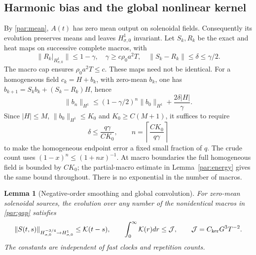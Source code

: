 \documentclass[11pt,a4paper]{amsart}
\newtheorem{lemma}[theorem]{Lemma}
\theoremstyle{definition}
\theoremstyle{remark}
\numberwithin{equation}{section}
\begin{document}
\subsection{Harmonic bias and the global nonlinear kernel}

By \eqref{par:mean}, $A(t)$ has zero mean output on solenoidal fields.
Consequently its evolution preserves means and leaves $H^1_{\sigma,0}$
invariant. Let $S_k,R_k$ be the exact and heat maps on successive complete
macros, with
\begin{equation}\label{par:gap}
 \|R_k|_{H^1_{\sigma,0}}\|\le1-\gamma,
 \quad \gamma\ge c\rho_0a^2T,
 \quad \|S_k-R_k\|\le\delta\le\gamma/2.
\end{equation}
The macro cap ensures $\rho_0a^2T\le c$. These maps need not be identical.
For a homogeneous field $c_k=H+b_k$, with zero-mean $b_k$, one has
$b_{k+1}=S_kb_k+(S_k-R_k)H$, hence
\begin{equation}\label{par:bias}
 \|b_n\|_{H^1}
 \le(1-\gamma/2)^n\|b_0\|_{H^1}+\frac{2\delta|H|}{\gamma}.
\end{equation}
Since $|H|\le M$, $\|b_0\|_{H^1}\le K_0$ and $K_0\ge C(M+1)$,
it suffices to require
\begin{equation}\label{par:biaschoice}
 \delta\le\frac{q\gamma}{CK_0},\qquad
 n=\left\lceil\frac{CK_0}{q\gamma}\right\rceil
\end{equation}
to make the homogeneous endpoint error a fixed small fraction of $q$.
The crude count uses $(1-x)^n\le(1+nx)^{-1}$.
At macro boundaries the full homogeneous field is bounded by $CK_0$;
the partial-macro estimate in Lemma~\ref{par:energy} gives the same bound
throughout. There is no exponential in the number of macros.

\begin{lemma}[Negative-order smoothing and global convolution]
\label{par:kernel}
For zero-mean solenoidal sources, the evolution over any number of the
nonidentical macros in \eqref{par:gap} satisfies
\[
 \|S(t,s)\|_{H^{-3/4}_{\sigma,0}\to H^1_{\sigma,0}}
 \le\mathcal K(t-s),\qquad
 \int_0^\infty\mathcal K(r)dr\le\mathcal J,
 \qquad \mathcal J=C_{\rm ker}G^3T^{-2}.
\]
The constants are independent of fast clocks and repetition counts.
\end{lemma}
\end{document}
